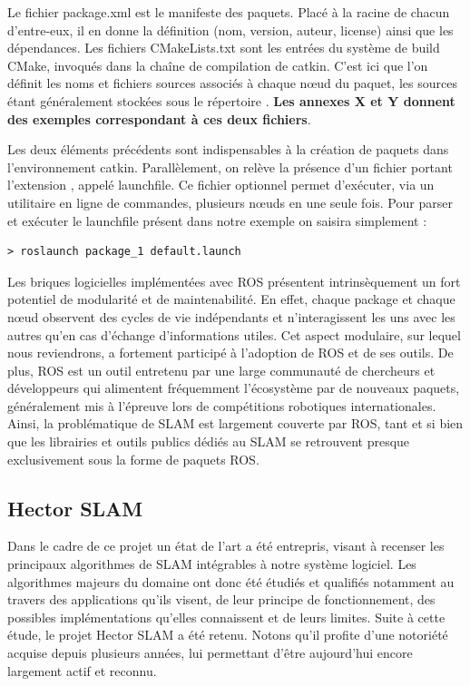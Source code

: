 Le fichier package.xml\cite{Bib_ROS_package} est le manifeste des paquets. Placé à la racine de chacun d'entre-eux, il en donne la définition (nom, version, auteur, license) ainsi que les dépendances. 
Les fichiers CMakeLists.txt\cite{Bib_ROS_manifeste} sont les entrées du système de build CMake, invoqués dans la chaîne de compilation de catkin. 
C'est ici que l'on définit les noms et fichiers sources associés à chaque n\oe{}ud du paquet, les sources étant généralement stockées sous le répertoire . 
\textbf{Les annexes X et Y donnent des exemples correspondant à ces deux fichiers}. 

Les deux éléments précédents sont indispensables à la création de paquets dans l'environnement catkin. 
Parallèlement, on relève la présence d'un fichier portant l'extension , appelé launchfile.  
Ce fichier optionnel permet d'exécuter, via un utilitaire en ligne de commandes, plusieurs n\oe{}uds en une seule fois. 
Pour parser et exécuter le launchfile présent dans notre exemple on saisira simplement :

\begin{lstlisting}[style=custombash]
> roslaunch package_1 default.launch
\end{lstlisting}


Les briques logicielles implémentées avec \gls{ROS} présentent intrinsèquement un fort potentiel de modularité et de maintenabilité. 
En effet, chaque package et chaque n\oe{}ud observent des cycles de vie indépendants et n'interagissent les uns avec les autres qu'en cas d'échange d'informations utiles. 
Cet aspect modulaire, sur lequel nous reviendrons, a fortement participé à l'adoption de \gls{ROS} et de ses outils. 
De plus, \gls{ROS} est un outil entretenu par une large communauté de chercheurs et développeurs qui alimentent fréquemment l'écosystème par de nouveaux paquets, généralement mis à l'épreuve lors de compétitions robotiques internationales. 
Ainsi, la problématique de \gls{SLAM} est largement couverte par \gls{ROS}, tant et si bien que les librairies et outils publics dédiés au \gls{SLAM} se retrouvent presque exclusivement sous la forme de paquets \gls{ROS}.

  \subsection{Hector SLAM}
  \label{subsection:hector}
  
Dans le cadre de ce projet un état de l'art a été entrepris, visant à recenser les principaux algorithmes de \gls{SLAM} intégrables à notre système logiciel.
Les algorithmes majeurs du domaine ont donc été étudiés et qualifiés notamment au travers des applications qu'ils visent, de leur principe de fonctionnement, des possibles implémentations qu'elles connaissent et de leurs limites. 
Suite à cette étude, le projet \gls{Hector SLAM} a été retenu. 
Notons qu'il profite d'une notoriété acquise depuis plusieurs années, lui permettant d'être aujourd'hui encore largement actif et reconnu\cite{Bib_Hector_2016}\cite{Bib_Team_Hector}. 

